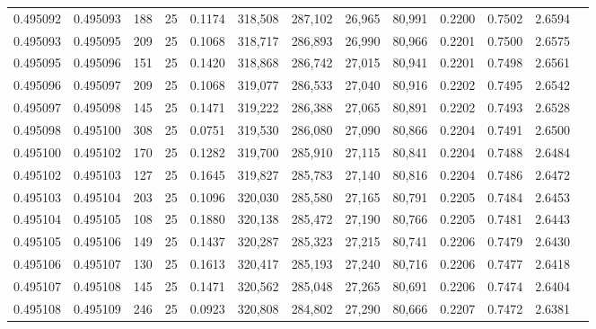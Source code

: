 \begin{tabular}{rrrrrrrrrrrrr}
0.495092 & 0.495093 &   188 &  25 &                                     0.1174 & 318,508 & 287,102 &  26,965 &  80,991 & 0.2200 & 0.7502 & 2.6594 \\
0.495093 & 0.495095 &   209 &  25 &                                     0.1068 & 318,717 & 286,893 &  26,990 &  80,966 & 0.2201 & 0.7500 & 2.6575 \\
0.495095 & 0.495096 &   151 &  25 &                                     0.1420 & 318,868 & 286,742 &  27,015 &  80,941 & 0.2201 & 0.7498 & 2.6561 \\
0.495096 & 0.495097 &   209 &  25 &                                     0.1068 & 319,077 & 286,533 &  27,040 &  80,916 & 0.2202 & 0.7495 & 2.6542 \\
0.495097 & 0.495098 &   145 &  25 &                                     0.1471 & 319,222 & 286,388 &  27,065 &  80,891 & 0.2202 & 0.7493 & 2.6528 \\
0.495098 & 0.495100 &   308 &  25 &                                     0.0751 & 319,530 & 286,080 &  27,090 &  80,866 & 0.2204 & 0.7491 & 2.6500 \\
0.495100 & 0.495102 &   170 &  25 &                                     0.1282 & 319,700 & 285,910 &  27,115 &  80,841 & 0.2204 & 0.7488 & 2.6484 \\
0.495102 & 0.495103 &   127 &  25 &                                     0.1645 & 319,827 & 285,783 &  27,140 &  80,816 & 0.2204 & 0.7486 & 2.6472 \\
0.495103 & 0.495104 &   203 &  25 &                                     0.1096 & 320,030 & 285,580 &  27,165 &  80,791 & 0.2205 & 0.7484 & 2.6453 \\
0.495104 & 0.495105 &   108 &  25 &                                     0.1880 & 320,138 & 285,472 &  27,190 &  80,766 & 0.2205 & 0.7481 & 2.6443 \\
0.495105 & 0.495106 &   149 &  25 &                                     0.1437 & 320,287 & 285,323 &  27,215 &  80,741 & 0.2206 & 0.7479 & 2.6430 \\
0.495106 & 0.495107 &   130 &  25 &                                     0.1613 & 320,417 & 285,193 &  27,240 &  80,716 & 0.2206 & 0.7477 & 2.6418 \\
0.495107 & 0.495108 &   145 &  25 &                                     0.1471 & 320,562 & 285,048 &  27,265 &  80,691 & 0.2206 & 0.7474 & 2.6404 \\
0.495108 & 0.495109 &   246 &  25 &                                     0.0923 & 320,808 & 284,802 &  27,290 &  80,666 & 0.2207 & 0.7472 & 2.6381 \\

\end{tabular}
